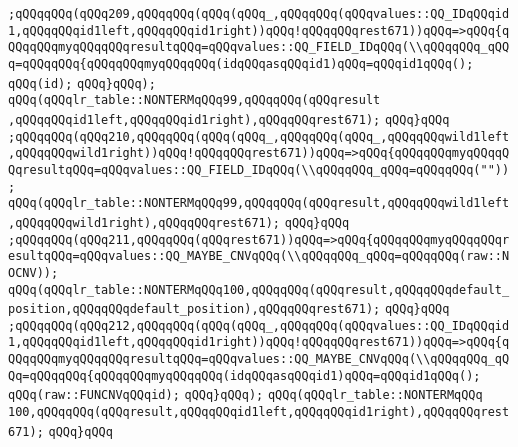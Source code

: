 \verb|;qQQqqQQq(qQQq209,qQQqqQQq(qQQq(qQQq_,qQQqqQQq(qQQqvalues::QQ_IDqQQqid1,qQQqqQQqid1left,qQQqqQQqid1right))qQQq!qQQqqQQqrest671))qQQq=>qQQq{qQQqqQQqmyqQQqqQQqresultqQQq=qQQqvalues::QQ_FIELD_IDqQQq(\\qQQqqQQq_qQQq=qQQqqQQq{qQQqqQQqmyqQQqqQQq(idqQQqasqQQqid1)qQQq=qQQqid1qQQq();|\newline
\verb|qQQq(id);|\newline
\verb|qQQq}qQQq);|\newline
\verb|qQQq(qQQqlr_table::NONTERMqQQq99,qQQqqQQq(qQQqresult|\newline
\verb|,qQQqqQQqid1left,qQQqqQQqid1right),qQQqqQQqrest671);|\newline
\verb|qQQq}qQQq|\newline
\verb|;qQQqqQQq(qQQq210,qQQqqQQq(qQQq(qQQq_,qQQqqQQq(qQQq_,qQQqqQQqwild1left,qQQqqQQqwild1right))qQQq!qQQqqQQqrest671))qQQq=>qQQq{qQQqqQQqmyqQQqqQQqresultqQQq=qQQqvalues::QQ_FIELD_IDqQQq(\\qQQqqQQq_qQQq=qQQqqQQq(""));|\newline
\verb|qQQq(qQQqlr_table::NONTERMqQQq99,qQQqqQQq(qQQqresult,qQQqqQQqwild1left,qQQqqQQqwild1right),qQQqqQQqrest671);|\newline
\verb|qQQq}qQQq|\newline
\verb|;qQQqqQQq(qQQq211,qQQqqQQq(qQQqrest671))qQQq=>qQQq{qQQqqQQqmyqQQqqQQqresultqQQq=qQQqvalues::QQ_MAYBE_CNVqQQq(\\qQQqqQQq_qQQq=qQQqqQQq(raw::NOCNV));|\newline
\verb|qQQq(qQQqlr_table::NONTERMqQQq100,qQQqqQQq(qQQqresult,qQQqqQQqdefault_position,qQQqqQQqdefault_position),qQQqqQQqrest671);|\newline
\verb|qQQq}qQQq|\newline
\verb|;qQQqqQQq(qQQq212,qQQqqQQq(qQQq(qQQq_,qQQqqQQq(qQQqvalues::QQ_IDqQQqid1,qQQqqQQqid1left,qQQqqQQqid1right))qQQq!qQQqqQQqrest671))qQQq=>qQQq{qQQqqQQqmyqQQqqQQqresultqQQq=qQQqvalues::QQ_MAYBE_CNVqQQq(\\qQQqqQQq_qQQq=qQQqqQQq{qQQqqQQqmyqQQqqQQq(idqQQqasqQQqid1)qQQq=qQQqid1qQQq();|\newline
\verb|qQQq(raw::FUNCNVqQQqid);|\newline
\verb|qQQq}qQQq);|\newline
\verb|qQQq(qQQqlr_table::NONTERMqQQq|\newline
\verb|100,qQQqqQQq(qQQqresult,qQQqqQQqid1left,qQQqqQQqid1right),qQQqqQQqrest671);|\newline
\verb|qQQq}qQQq|\newline

